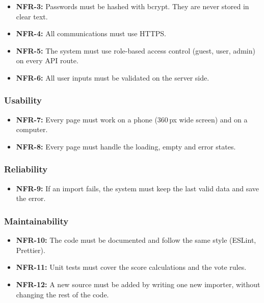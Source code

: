 \documentclass[11pt,a4paper]{article}
\begin{document}
\begin{itemize}
  \item \textbf{NFR-3:} Passwords must be hashed with bcrypt. They are never stored in clear text.
  \item \textbf{NFR-4:} All communications must use HTTPS.
  \item \textbf{NFR-5:} The system must use role-based access control (guest, user, admin) on every API route.
  \item \textbf{NFR-6:} All user inputs must be validated on the server side.
\end{itemize}

\subsubsection{Usability}

\begin{itemize}
  \item \textbf{NFR-7:} Every page must work on a phone (360\,px wide screen) and on a computer.
  \item \textbf{NFR-8:} Every page must handle the loading, empty and error states.
\end{itemize}

\subsubsection{Reliability}

\begin{itemize}
  \item \textbf{NFR-9:} If an import fails, the system must keep the last valid data and save the error.
\end{itemize}

\subsubsection{Maintainability}

\begin{itemize}
  \item \textbf{NFR-10:} The code must be documented and follow the same style (ESLint, Prettier).
  \item \textbf{NFR-11:} Unit tests must cover the score calculations and the vote rules.
  \item \textbf{NFR-12:} A new source must be added by writing one new importer, without changing the rest of the code.
\end{itemize}
\end{document}
